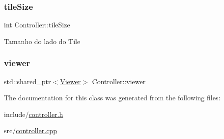 \subsubsection{\texorpdfstring{tile\+Size}{tileSize}}
{\footnotesize\ttfamily int Controller\+::tile\+Size\hspace{0.3cm}{\ttfamily [private]}}

Tamanho do lado do Tile \mbox{\label{classController_a9a290ffa5eeaf96a42daa9a68dc501ff}} 
\subsubsection{\texorpdfstring{viewer}{viewer}}
{\footnotesize\ttfamily std\+::shared\+\_\+ptr$<$\hyperlink{classViewer}{Viewer}$>$ Controller\+::viewer\hspace{0.3cm}{\ttfamily [private]}}



The documentation for this class was generated from the following files\+:\begin{DoxyCompactItemize}
\item 
include/\hyperlink{controller_8h}{controller.\+h}\item 
src/\hyperlink{controller_8cpp}{controller.\+cpp}\end{DoxyCompactItemize}
